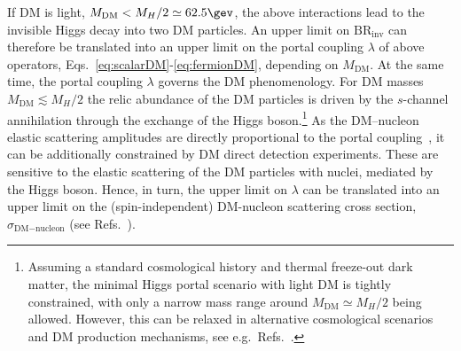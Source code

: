 \documentclass[../report.tex]{subfiles}
\newcommand{\BRHinv}{\mathrm{BR}_\mathrm{inv}}
\begin{document}
If DM is light, $M_\text{DM} < M_H /2 \simeq 62.5\gev$, the above interactions lead to the invisible Higgs decay into two DM particles. An upper limit on $\BRHinv$ can therefore be translated into an upper limit on the portal coupling $\lambda$ of above operators, Eqs.~\eqref{eq:scalarDM}-\eqref{eq:fermionDM}, depending on $M_\text{DM}$.  At the same time, the portal coupling $\lambda$ governs the DM phenomenology. For DM masses $M_\text{DM} \lesssim M_H/2$ the relic abundance of the DM particles is driven by the $s$-channel annihilation through the exchange of the Higgs boson.\footnote{Assuming a standard cosmological history and thermal freeze-out dark matter, the minimal Higgs portal scenario with light DM is tightly constrained, with only a narrow mass range around $M_\text{DM} \simeq M_H/2$ being  allowed. However, this can be relaxed in alternative cosmological scenarios and DM production mechanisms, see e.g.~Refs.~\cite{Hardy:2018bph,Bernal:2018ins,Bernal:2018kcw}.} As the DM--nucleon elastic scattering amplitudes are directly proportional to the portal coupling~\cite{Kanemura:2010sh}, it can be additionally constrained by DM direct detection experiments.  These are sensitive to the elastic scattering of the DM particles with nuclei, mediated by the Higgs boson. Hence, in turn, the upper limit on $\lambda$ can be translated into an upper limit on the (spin-independent) DM-nucleon scattering cross section, $\sigma_{\text{DM}-\text{nucleon}}$ (see Refs.~\cite{Kanemura:2010sh,Djouadi:2011aa}).
\end{document}
